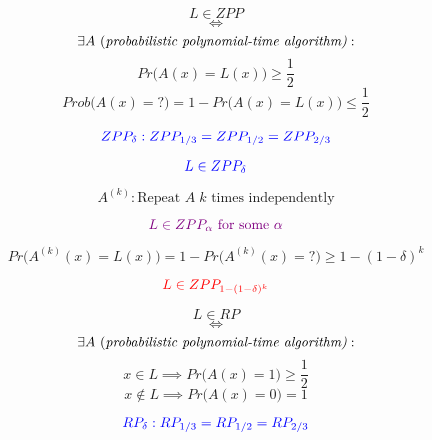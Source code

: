
\begin{frame}
  \begin{definition}
	\[
	  L \in ZPP
	\]
	\[
	  \iff
	\]
	\[
	  \exists A \text{ (\it probabilistic polynomial-time algorithm)}: 
	\]
	\[
	  Pr\Big(A(x) = L(x)\Big) \ge \frac{1}{2}
	\]
	\[
	  Prob\Big(A(x) = ?\Big) = 1 - Pr\Big(A(x) = L(x)\Big) \le \frac{1}{2}
	\]
  \end{definition}

  \pause
  \begin{center}
	 \pause
	\[
	  \textcolor{blue}{ZPP_{\delta}: ZPP_{1/3} = ZPP_{1/2} = ZPP_{2/3}}
	\]
  \end{center}
\end{frame}

\begin{frame}
  \[
	\textcolor{blue}{L \in ZPP_{\delta}}
  \]

  \pause
  \[
	A^{(k)}: \text{Repeat } A\; k \text{ times independently}
  \]

  \pause
  \begin{center}
  \end{center}

  \pause
  \[
	\textcolor{violet}{L \in ZPP_{\alpha} \text{ for some } \alpha}
  \]

  \pause
  \[
	Pr\Big(A^{(k)}(x) = L(x)\Big) = 1 - Pr\Big(A^{(k)}(x) = ?\Big) \ge 1 - (1 - \delta)^{k}
  \]

  \pause
  \[
	\textcolor{red}{L \in ZPP_{1 - (1-\delta)^{k}}}
  \]
\end{frame}

\begin{frame}
  \begin{definition}
	\[
	  L \in RP
	\]
	\[
	  \iff
	\]
	\[
	  \exists A \text{ (\it probabilistic polynomial-time algorithm)}: 
	\]
	\[
	  x \in L \implies Pr\Big(A(x) = 1\Big) \ge \frac{1}{2}
	\]
	\[
	  x \notin L \implies Pr\Big(A(x) = 0\Big) = 1
	\]
  \end{definition}

  \begin{center}
	 \pause
	\[
	  \textcolor{blue}{RP_{\delta}: RP_{1/3} = RP_{1/2} = RP_{2/3}}
	\]
  \end{center}
\end{frame}

